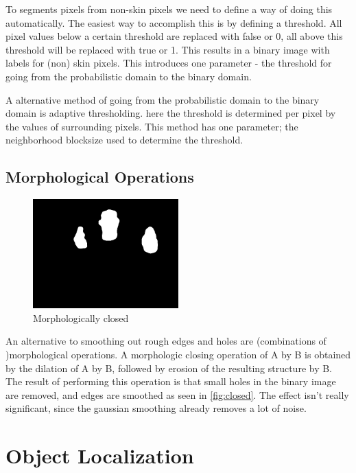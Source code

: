 To segments pixels from non-skin pixels we need to define a way of doing this automatically. The easiest way to accomplish this is by defining a threshold. All pixel values below a certain threshold are replaced with false or 0, all above this threshold will be replaced with true or 1. This results in a binary image with labels for (non) skin pixels. This introduces one parameter - the 
threshold for going from the probabilistic domain to the binary domain.

A alternative method of going from the probabilistic domain to the binary domain is adaptive thresholding. here the threshold is determined per pixel by the values of surrounding pixels. This method has one parameter; the neighborhood blocksize used to determine the threshold.


\subsection*{Morphological Operations}

\begin{figure}[htbp]
    \center{}
    \includegraphics[width=0.5\textwidth]{figures/pipeline/closed.jpg}
	\caption{Morphologically closed}
	\label{fig:closed}
\end{figure}

An alternative to smoothing out rough edges and holes are (combinations of )morphological operations.  A morphologic closing operation of A by B is obtained by the dilation of A by B, followed by erosion of the resulting structure by B. The result of performing this operation is that small holes in the binary image are removed, and edges are smoothed as seen in \autoref{fig:closed}. The effect isn't really significant, since the gaussian smoothing already removes a lot of noise. 


\section{Object Localization}

